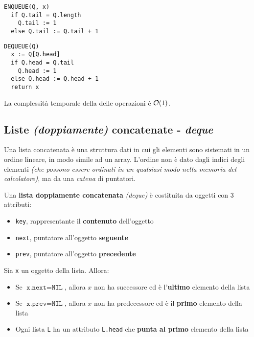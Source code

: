 \documentclass[italian, 10pt]{article}
\begin{document}
\begin{minipage}[t]{0.495\textwidth}
  \begin{lstlisting}[style=pseudocode, caption={\texttt{ENQUEUE} in coda}, label={lst:enqueue-coda}]
ENQUEUE(Q, x)
  if Q.tail = Q.length
    Q.tail := 1
  else Q.tail := Q.tail + 1
  \end{lstlisting}
\end{minipage}
\begin{minipage}[t]{0.495\textwidth}
  \begin{lstlisting}[style=pseudocode, caption={\texttt{DEQUEUE} in coda}, label={lst:dequeue-coda}]
DEQUEUE(Q)
  x := Q[Q.head]
  if Q.head = Q.tail
    Q.head := 1
  else Q.head := Q.head + 1
  return x
  \end{lstlisting}
\end{minipage}

La complessità temporale della delle operazioni è \(\mathcal{O}(1)\).

\subsection{Liste \textit{(doppiamente)} concatenate - \textit{deque}}
\label{sec:liste-concatenate}

Una lista concatenata è una struttura dati in cui gli elementi sono sistemati in un ordine lineare, in modo simile ad un array.
L'ordine non è dato dagli indici degli elementi \textit{(che possono essere ordinati in un qualsiasi modo nella memoria del calcolatore)}, ma da una \textit{catena} di puntatori.

Una \textbf{lista doppiamente concatenata} \textit{(deque)} è costituita da oggetti con \(3\) attributi:

\begin{itemize}
  \item \texttt{key}, rappresentante il \textbf{contenuto} dell'oggetto
  \item \texttt{next}, puntatore all'oggetto \textbf{seguente}
  \item \texttt{prev}, puntatore all'oggetto \textbf{precedente}
\end{itemize}

Sia \texttt{x} un oggetto della lista.
Allora:

\begin{itemize}
  \item Se \(\texttt{x.next} = \texttt{NIL}\), allora \(x\) non ha successore ed è l'\textbf{ultimo} elemento della lista
  \item Se \(\texttt{x.prev} = \texttt{NIL}\), allora \(x\) non ha predecessore ed è il \textbf{primo} elemento della lista
  \item Ogni lista \texttt{L} ha un attributo \texttt{L.head} che \textbf{punta al primo} elemento della lista
\end{itemize}
\end{document}
